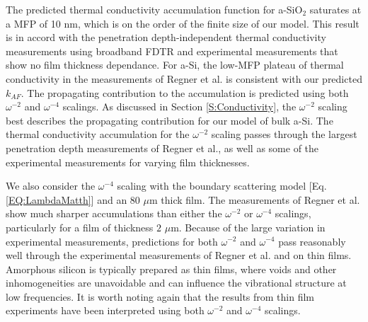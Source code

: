\documentclass[aps,prb,twocolumn,superscriptaddress,footinbib,amsmath,amssymb,floatfix]{revtex4}
\begin{document}
The predicted thermal conductivity accumulation function for a-SiO$_2$ 
saturates 
at a MFP of 10 nm, which is on the order of the finite size 
of our model.  
This result is in accord 
with the penetration depth-independent thermal 
conductivity measurements using broadband FDTR
\cite{regner_broadband_2013} and experimental measurements 
that show no film thickness dependance.
\cite{lee_heat_1997,yamane_measurement_2002} 
For a-Si, the low-MFP plateau of thermal conductivity in the   
measurements of Regner et al. is consistent with our 
predicted $k_{AF}$. 
The propagating contribution to the accumulation is predicted 
using both $\omega^{-2}$ and $\omega^{-4}$ scalings.  
As discussed in Section \ref{S:Conductivity}, 
the $\omega^{-2}$ scaling best describes the propagating 
contribution for our model of bulk a-Si. 
The thermal conductivity accumulation for the $\omega^{-2}$ 
scaling 
passes through the largest penetration 
depth measurements of Regner et al., as well as some of the  
experimental measurements for varying film thicknesses. 

We also consider the $\omega^{-4}$ scaling with the boundary 
scattering model [Eq. \eqref{EQ:LambdaMatth}] and an 80 $\mu$m 
thick film. 
The measurements of Regner et al. show much sharper accumulations 
than either the $\omega^{-2}$ or $\omega^{-4}$ scalings, 
particularly for a film of thickness $2$ $\mu$m. 
Because of the large variation in 
experimental measurements, predictions for both $\omega^{-2}$ 
and $\omega^{-4}$ pass reasonably well 
through the experimental measurements of Regner et al. and 
on thin films. 
Amorphous silicon is typically 
prepared as thin films,\cite{vacher_attenuation_1980} 
where voids and other inhomogeneities are unavoidable and can 
influence the vibrational structure at low frequencies.
\cite{feldman_tight-binding_2004,liu_high_2009,
yang_anomalously_2010,li_effect_2011,li_enhancement_2012} 
It is worth noting again 
that the results from thin film experiments have been interpreted 
using both $\omega^{-2}$ and $\omega^{-4}$ scalings.
\cite{feldman_thermal_1993,cahill_thermal_1994,
feldman_numerical_1999,liu_high_2009,yang_anomalously_2010} 

\end{document}
